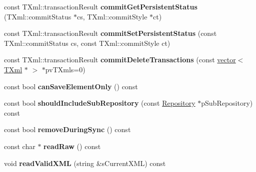 \begin{DoxyCompactItemize}
\item 
\hypertarget{classgeneral__server_1_1Directory_aa9270c2a6707550ac1e3da2d719687ff}{const \-T\-Xml\-::transaction\-Result {\bfseries commit\-Get\-Persistent\-Status} (\-T\-Xml\-::commit\-Status $\ast$cs, \-T\-Xml\-::commit\-Style $\ast$ct)}\label{classgeneral__server_1_1Directory_aa9270c2a6707550ac1e3da2d719687ff}

\item 
\hypertarget{classgeneral__server_1_1Directory_ae0c804580c1275910de001d40fad2f26}{const \-T\-Xml\-::transaction\-Result {\bfseries commit\-Set\-Persistent\-Status} (const \-T\-Xml\-::commit\-Status cs, const \-T\-Xml\-::commit\-Style ct)}\label{classgeneral__server_1_1Directory_ae0c804580c1275910de001d40fad2f26}

\item 
\hypertarget{classgeneral__server_1_1Directory_a9b3776f0de34f4d146da24576fb9292c}{const \-T\-Xml\-::transaction\-Result {\bfseries commit\-Delete\-Transactions} (const \hyperlink{classvector}{vector}$<$ \hyperlink{classgeneral__server_1_1TXml}{\-T\-Xml} $\ast$ $>$ $\ast$pv\-T\-Xmls=0)}\label{classgeneral__server_1_1Directory_a9b3776f0de34f4d146da24576fb9292c}

\item 
\hypertarget{classgeneral__server_1_1Directory_a45d7d758e5e9507908914133a0e6d791}{const bool {\bfseries can\-Save\-Element\-Only} () const }\label{classgeneral__server_1_1Directory_a45d7d758e5e9507908914133a0e6d791}

\item 
\hypertarget{classgeneral__server_1_1Directory_a4c91d2c4ba6f647fd2012361cf41f2d7}{const bool {\bfseries should\-Include\-Sub\-Repository} (const \hyperlink{classgeneral__server_1_1Repository}{\-Repository} $\ast$p\-Sub\-Repository) const }\label{classgeneral__server_1_1Directory_a4c91d2c4ba6f647fd2012361cf41f2d7}

\item 
\hypertarget{classgeneral__server_1_1Directory_ae29391ad8535569c70cb71626402b16e}{const bool {\bfseries remove\-During\-Sync} () const }\label{classgeneral__server_1_1Directory_ae29391ad8535569c70cb71626402b16e}

\item 
\hypertarget{classgeneral__server_1_1Directory_a5c7488c3066ffe904554a56254048601}{const char $\ast$ {\bfseries read\-Raw} () const }\label{classgeneral__server_1_1Directory_a5c7488c3066ffe904554a56254048601}

\item 
\hypertarget{classgeneral__server_1_1Directory_a7523d4a237370868f17e4460d6f0c4fc}{void {\bfseries read\-Valid\-X\-M\-L} (string \&s\-Current\-X\-M\-L) const }\label{classgeneral__server_1_1Directory_a7523d4a237370868f17e4460d6f0c4fc}


\end{DoxyCompactItemize}
